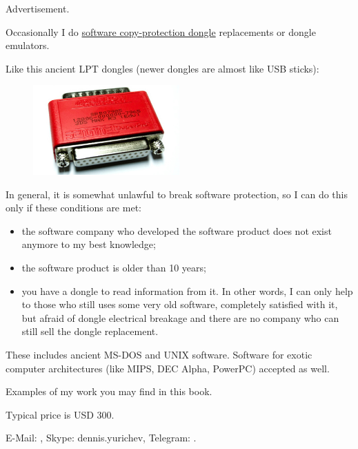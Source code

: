 
Advertisement.

Occasionally I do \href{https://en.wikipedia.org/wiki/Software_protection_dongle}{software copy-protection dongle} replacements or dongle emulators.

Like this ancient LPT dongles (newer dongles are almost like USB sticks):

\begin{figure}[H]
\centering
\includegraphics[width=0.5\textwidth]{superpro.jpg}
\end{figure}

In general, it is somewhat unlawful to break software protection, so I can do this only if these conditions are met:

	\begin{itemize}
	\item the software company who developed the software product does not exist anymore to my best knowledge;
	\item the software product is older than 10 years;
	\item you have a dongle to read information from it. In other words, I can only help to those who still uses some very old software, completely satisfied with it, but afraid of dongle electrical breakage and there are no company who can still sell the dongle replacement.
	\end{itemize}

These includes ancient MS-DOS and UNIX software. Software for exotic computer architectures (like MIPS, DEC Alpha, PowerPC) accepted as well.

Examples of my work you may find in this book.

Typical price is USD 300.

E-Mail: \EMAIL{}, Skype: dennis.yurichev, Telegram: .


